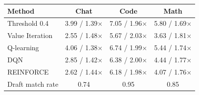 \begin{tabular}{@{}lccc@{}}
\toprule
Method & Chat & Code & Math \\
\midrule
Threshold 0.4 & 3.99 / 1.39$\times$ & 7.05 / 1.96$\times$ & 5.80 / 1.69$\times$ \\
Value Iteration & 2.55 / 1.48$\times$ & 5.67 / 2.03$\times$ & 3.63 / 1.81$\times$ \\
Q-learning & 4.06 / 1.38$\times$ & 6.74 / 1.99$\times$ & 5.44 / 1.74$\times$ \\
DQN & 2.85 / 1.42$\times$ & 6.38 / 2.00$\times$ & 4.44 / 1.77$\times$ \\
REINFORCE & 2.62 / 1.44$\times$ & 6.18 / 1.98$\times$ & 4.07 / 1.76$\times$ \\
\midrule
Draft match rate & 0.74 & 0.95 & 0.85 \\
\bottomrule
\end{tabular}